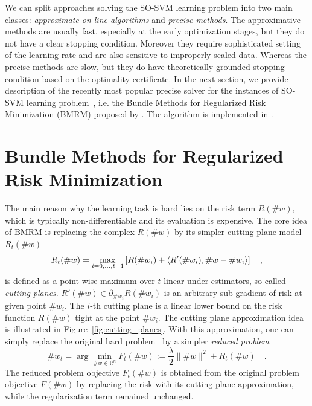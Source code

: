 We can split approaches solving the SO-SVM learning problem into two main classes: {\sl approximate on-line algorithms} and {\sl precise methods}. The approximative methods are usually fast, especially at the early optimization stages, but they do not have a clear stopping condition. Moreover they require sophisticated setting of the learning rate and are also sensitive to improperly scaled data. Whereas the precise methods are slow, but they do have theoretically grounded stopping condition based on the optimality certificate. In the next section, we provide description of the recently most popular precise solver for the instances of SO-SVM learning problem~, i.e. the Bundle Methods for Regularized Risk Minimization (BMRM) proposed by \cite{Teo-BMRM-JMLR10}. The algorithm is implemented in .

\section{Bundle Methods for Regularized Risk Minimization} \label{sec:bmrm}

The main reason why the learning task  is hard lies on the risk term $R(\#w)$, which is typically non-differentiable and its evaluation is expensive. The core idea of BMRM is replacing the complex $R(\#w)$ by its simpler cutting plane model $R_t(\#w)$
%
\begin{equation}
	R_t(\#w) = \max_{i=0,\dots, t-1} \left[ R(\#w_i) + \langle R'(\#w_i), \#w - \#w_i  \rangle  \right] \quad,
\end{equation}
%
is defined as a point wise maximum over $t$ linear under-estimators, so called {\sl cutting planes}. $R'(\#w) \in \partial_{\#w_i} R(\#w_i)$ is an arbitrary sub-gradient of risk at given point $\#w_i$. The $i$-th cutting plane is a linear lower bound on the risk function $R(\#w)$ tight at the point $\#w_i$. The cutting plane approximation idea is illustrated in Figure~\ref{fig:cutting_planes}. With this approximation, one can simply replace the original hard problem~ by a simpler {\sl reduced problem}
%
\begin{equation}
	\#w_t = \arg\min_{\#w \in \mathbb{R}^n} F_t(\#w) := \frac{\lambda}{2} \| \#w  \|^2 + R_t(\#w) \quad. \label{eq:reduced_problem}
\end{equation}
%
The reduced problem objective $F_t(\#w)$ is obtained from the original problem objective $F(\#w)$ by replacing the risk with its cutting plane approximation, while the regularization term remained unchanged.


